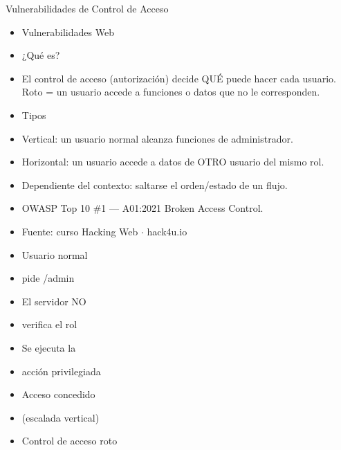 \documentclass[aspectratio=169,10pt]{beamer}
\begin{document}
\begin{frame}[allowframebreaks]{Vulnerabilidades de Control de Acceso}
\small
  \begin{itemize}
  \item Vulnerabilidades Web
  \item ¿Qué es?
  \item El control de acceso (autorización) decide QUÉ puede hacer cada usuario. Roto = un usuario accede a funciones o datos que no le corresponden.
  \item Tipos
  \item Vertical: un usuario normal alcanza funciones de administrador.
  \item Horizontal: un usuario accede a datos de OTRO usuario del mismo rol.
  \item Dependiente del contexto: saltarse el orden/estado de un flujo.
  \item OWASP Top 10 \#1 --- A01:2021 Broken Access Control.
  \item Fuente: curso Hacking Web $\cdot$ hack4u.io
  \item Usuario normal
  \item pide /admin
  \item El servidor NO
  \item verifica el rol
  \item Se ejecuta la
  \item acción privilegiada
  \item Acceso concedido
  \item (escalada vertical)
  \item Control de acceso roto
  \end{itemize}
\end{frame}
\end{document}
